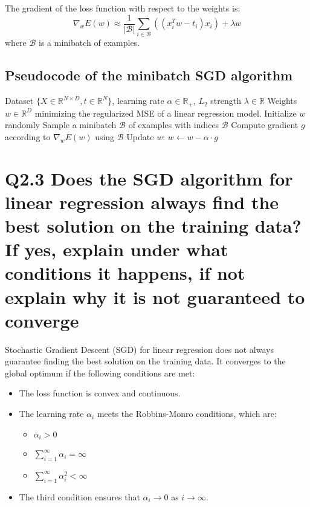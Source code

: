 \documentclass[11pt]{article}
\begin{document}
The gradient of the loss function with respect to the weights is:
\[
\nabla_w E(w) \approx \frac{1}{|\mathcal{B}|} \sum_{i \in \mathcal{B}} ((x_i^T w - t_i)x_i) + \lambda w
\]
where \( \mathcal{B} \) is a minibatch of examples.

\begin{algorithm}
\subsection*{Pseudocode of the minibatch SGD algorithm}
\begin{algorithmic}[1]
\Require Dataset \( \{X \in \mathbb{R}^{N \times D}, t \in \mathbb{R}^N\} \), learning rate \( \alpha \in \mathbb{R}_+ \), \( L_2 \) strength \( \lambda \in \mathbb{R} \)
\Ensure Weights \( w \in \mathbb{R}^D \) minimizing the regularized MSE of a linear regression model.
\State Initialize \( w \) randomly
\Repeat
    \State Sample a minibatch \( \mathcal{B} \) of examples with indices \( \mathcal{B} \)
    \State Compute gradient \( g \) according to \( \nabla_w E(w) \) using \( \mathcal{B} \)
    \State Update \( w \): \( w \leftarrow w - \alpha \cdot g \)
\end{algorithmic}
\end{algorithm}


\section{Q2.3 Does the SGD algorithm for linear regression always find the best solution on the training data? If yes, explain under what conditions it happens, if not explain why it is not guaranteed to converge}

Stochastic Gradient Descent (SGD) for linear regression does not always guarantee finding the best solution on the training data. It converges to the global optimum if the following conditions are met:

\begin{itemize}
    \item The loss function is convex and continuous.
    \item The learning rate \( \alpha_i \) meets the Robbins-Monro conditions, which are:
    \begin{itemize}
        \item \( \alpha_i > 0 \)
        \item \( \sum_{i=1}^{\infty} \alpha_i = \infty \)
        \item \( \sum_{i=1}^{\infty} \alpha_i^2 < \infty \)
    \end{itemize}
    \item The third condition ensures that \( \alpha_i \rightarrow 0 \) as \( i \rightarrow \infty \).
\end{itemize}
\end{document}
